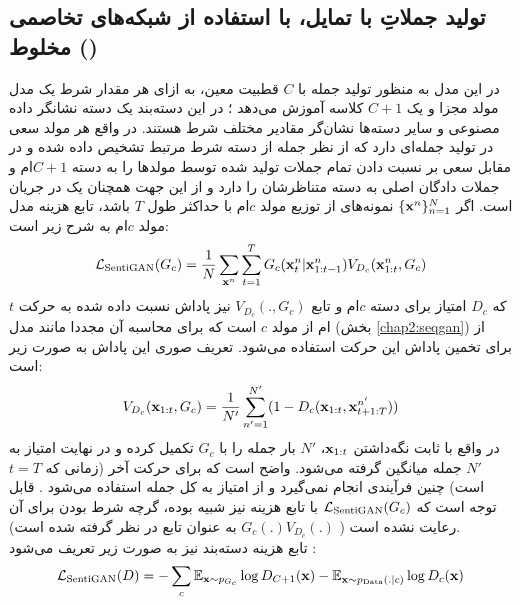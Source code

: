 \subsection{
    تولید جملاتِ با تمایل، با استفاده از شبکه‌های تخاصمی مخلوط
     ()\protect{}
}
در این مدل به منظور تولید جمله با $C$ قطبیت معین، به ازای هر مقدار شرط یک مدل مولد مجزا و یک
 $C+1$
کلاسه آموزش می‌دهد \cite{sentigan}؛ در این دسته‌بند یک دسته نشانگر داده مصنوعی و سایر دسته‌ها نشان‌گر مقادیر مختلف شرط هستند. در واقع هر مولد سعی در تولید جمله‌ای دارد که از نظر \classifier{} جمله از دسته شرط مرتبط تشخیص داده شده و در مقابل \classifier{} سعی بر نسبت دادن تمام جملات تولید شده توسط مولد‌ها را به دسته $C+1$ام و جملات دادگان اصلی به دسته متناظرشان را دارد و از این جهت همچنان یک \minmaxgame{} در جریان است. اگر
$\{ {\bf x}^n \}_{n=1}^N$
نمونه‌های از توزیع مولد $c$ام با حداکثر طول $T$ باشد، تابع هزینه مدل مولد $c$ام به شرح زیر است:
\begin{align}
	{\mathcal{L}}_\text{SentiGAN}(G_c) = \frac{1}{N}
	\sum_{{\bf x}^n} \sum_{t=1}^{T}
	G_c({\bf x}^n_t|{\bf x}^n_{1:t-1})
	V_{D_c}({\bf x}^n_{1:t}, G_c)
\end{align}
که $D_c$ امتیاز \discriminator{} برای دسته $c$ام و تابع $V_{D_c}(., G_c)$ نیز پاداش نسبت داده شده به حرکت $t$ام از مولد $c$ است که برای محاسبه آن مجددا مانند مدل  (بخش \ref{chap2:seqgan}) از  \montecarlosearch{} برای تخمین پاداش این حرکت استفاده می‌شود. تعریف صوری این پاداش به صورت زیر است:
\begin{align}
	V_{D_c}({\bf x}_{1:t}, G_c) = \frac{1}{N'} \sum_{n'=1}^{N'} (1 - D_c({\bf x}_{1:t}, {\bf x}^{n'}_{t+1:T}))
\end{align}
در واقع با ثابت نگه‌داشتن ${\bf x}_{1:t}$،
$N'$
بار جمله را با $G_c$ تکمیل کرده و در نهایت امتیاز \discriminator{} به  $N'$ جمله میانگین گرفته می‌شود. واضح است که برای حرکت آخر (زمانی که $t=T$ است) چنین فرآیندی انجام نمی‌گیرد و از امتیاز \discriminator{} به کل جمله استفاده می‌شود \cite{sentigan}. قابل توجه است که ${\mathcal{L}}_\text{SentiGAN}(G_c)$ با تابع هزینه \wgan{} نیز شبیه بوده، گرچه شرط  بودن برای آن رعایت نشده است
( $G_c(.)V_{D_c}(.)$
به عنوان تابع \critic{} در نظر گرفته شده است).
\\
تابع هزینه دسته‌بند نیز به صورت زیر تعریف می‌شود \cite{sentigan}:
\begin{align}
	{\mathcal{L}}_\text{SentiGAN} (D) =
	- \sum_c \mathbb E_{{\bf x} \sim p_{G_c}} \log D_{C+1} ({\bf x})
	- \mathbb E_{{\bf x} \sim p_\text{Data}(.|c)} \log D_c({\bf x})
\end{align}

